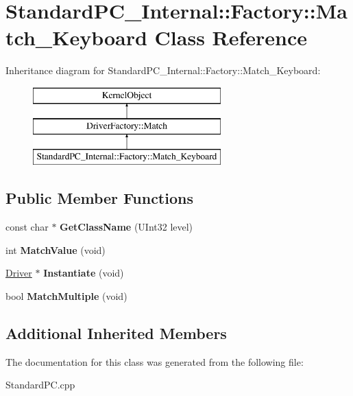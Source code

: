 \hypertarget{class_standard_p_c___internal_1_1_factory_1_1_match___keyboard}{}\section{Standard\+P\+C\+\_\+\+Internal\+:\+:Factory\+:\+:Match\+\_\+\+Keyboard Class Reference}
\label{class_standard_p_c___internal_1_1_factory_1_1_match___keyboard}
Inheritance diagram for Standard\+P\+C\+\_\+\+Internal\+:\+:Factory\+:\+:Match\+\_\+\+Keyboard\+:\begin{figure}[H]
\begin{center}
\leavevmode
\includegraphics[height=3.000000cm]{class_standard_p_c___internal_1_1_factory_1_1_match___keyboard}
\end{center}
\end{figure}
\subsection*{Public Member Functions}
\begin{DoxyCompactItemize}
\item 
\mbox{\label{class_standard_p_c___internal_1_1_factory_1_1_match___keyboard_a8197dfd37f380984ddc3e57f385d3edd}} 
const char $\ast$ {\bfseries Get\+Class\+Name} (U\+Int32 level)
\item 
\mbox{\label{class_standard_p_c___internal_1_1_factory_1_1_match___keyboard_a2e62a516a76c58a55fbdb85b36c93c9a}} 
int {\bfseries Match\+Value} (void)
\item 
\mbox{\label{class_standard_p_c___internal_1_1_factory_1_1_match___keyboard_a5e34875dc9a788ebef8dd7bb826bd36e}} 
\hyperlink{class_driver}{Driver} $\ast$ {\bfseries Instantiate} (void)
\item 
\mbox{\label{class_standard_p_c___internal_1_1_factory_1_1_match___keyboard_a851cf29f6c63ea54b1fea33dcc2f214c}} 
bool {\bfseries Match\+Multiple} (void)
\end{DoxyCompactItemize}
\subsection*{Additional Inherited Members}


The documentation for this class was generated from the following file\+:\begin{DoxyCompactItemize}
\item 
Standard\+P\+C.\+cpp\end{DoxyCompactItemize}
